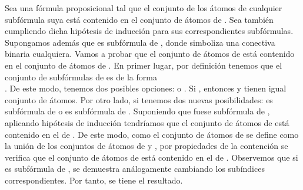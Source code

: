 \begin{isabellebody}
\begin{isamarkuptext}
\begin{demostracion}
  Sea  una fórmula proposicional tal que el conjunto de los átomos 
  de cualquier subfórmula suya está contenido en el conjunto de átomos 
  de . Sea también \\ cumpliendo dicha hipótesis de inducción 
  para sus correspondientes subfórmulas. Supongamos además que  es
  subfórmula de , donde \isa{{\isacharasterisk}} simboliza una conectiva binaria 
  cualquiera. Vamos a probar que el conjunto de átomos de  está 
  contenido en el conjunto de átomos de .
  En primer lugar, por definición tenemos que el conjunto de
  subfórmulas de  es de la forma\\
  . De este modo, 
  tenemos dos posibles opciones:
   o .
  Si , entonces  y tienen igual conjunto de 
  átomos.
  Por otro lado, si  tenemos dos nuevas
  posibilidades:  es subfórmula de  o  es subfórmula de .
  Suponiendo que fuese subfórmula de , aplicando hipótesis de
  inducción tendríamos que el conjunto de átomos de  está contenido 
  en el de . De este modo, como el conjunto de átomos de  se
  define como la unión de los conjuntos de átomos de  y , por
  propiedades de la contención se verifica que el conjunto de átomos de
   está contenido en el de . Observemos que si  es 
  subfórmula de , se demuestra análogamente cambiando los
  subíndices correspondientes. Por tanto, se tiene el resultado.      
  \end{demostracion}


\end{isamarkuptext}
\end{isabellebody}
